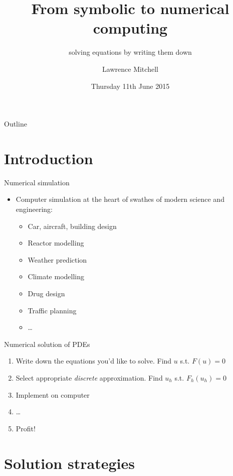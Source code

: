 \documentclass[presentation]{beamer}
\subtitle{solving equations by writing them down}
\institute{Departments of Computing and Mathematics, Imperial College London}
\author{Lawrence Mitchell}
\date{Thursday 11th June 2015}
\title{From symbolic to numerical computing}
\begin{document}
\maketitle
\begin{frame}{Outline}
\tableofcontents
\end{frame}



\section{Introduction}
\label{sec-1}

\begin{frame}[label=sec-1-1]{Numerical simulation}
\begin{itemize}
\item Computer simulation at the heart of swathes of modern science and
engineering:

\begin{itemize}
\item Car, aircraft, building design
\item Reactor modelling
\item Weather prediction
\item Climate modelling
\item Drug design
\item Traffic planning
\item \ldots{}
\end{itemize}
\end{itemize}
\end{frame}

\begin{frame}[label=sec-1-2]{Numerical solution of PDEs}
\begin{enumerate}
\item Write down the equations you'd like to solve.  Find $u$ s.t.
$F(u) = 0$
\item Select appropriate \emph{discrete} approximation.  Find $u_h$ s.t.
$F_h(u_h) = 0$
\item Implement on computer
\item \ldots{}
\item Profit!
\end{enumerate}
\end{frame}

\section{Solution strategies}
\label{sec-2}
\end{document}
